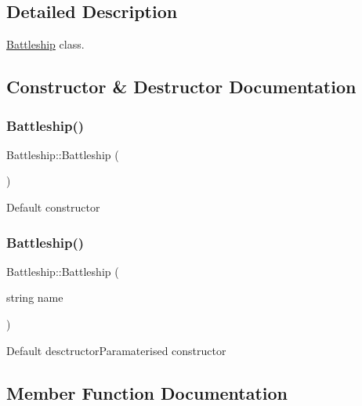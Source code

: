 \subsection{Detailed Description}
\hyperlink{classBattleship}{Battleship} class. 

\subsection{Constructor \& Destructor Documentation}
\mbox{\label{classBattleship_a57a0db9eadfe53049035b3b0e5ec5367}} 
\subsubsection{\texorpdfstring{Battleship()}{Battleship()}\hspace{0.1cm}{\footnotesize\ttfamily [1/2]}}
{\footnotesize\ttfamily Battleship\+::\+Battleship (\begin{DoxyParamCaption}{ }\end{DoxyParamCaption})\hspace{0.3cm}{\ttfamily [inline]}}

Default constructor \mbox{\label{classBattleship_afdc3250fb22d1d2dac6f1f71041888c4}} 
\subsubsection{\texorpdfstring{Battleship()}{Battleship()}\hspace{0.1cm}{\footnotesize\ttfamily [2/2]}}
{\footnotesize\ttfamily Battleship\+::\+Battleship (\begin{DoxyParamCaption}\item[{string}]{name }\end{DoxyParamCaption})\hspace{0.3cm}{\ttfamily [inline]}}

Default desctructor\+Paramaterised constructor 

\subsection{Member Function Documentation}
\mbox{\label{classBattleship_a698e2d0ef1ffa4e6b5e7b09c0ff7d07c}} 
